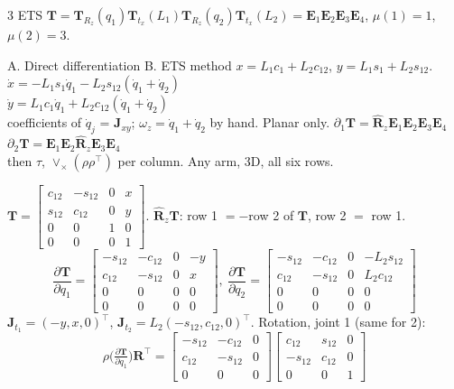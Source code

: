 \begin{multicols}{3}
ETS $\mathbf T=\mathbf T_{R_z}(q_1)\mathbf T_{t_x}(L_1)\mathbf T_{R_z}(q_2)\mathbf T_{t_x}(L_2)=\mathbf E_1\mathbf E_2\mathbf E_3\mathbf E_4$, $\mu(1)=1$, $\mu(2)=3$.
\begin{twoway}{A. Direct differentiation }{B. ETS method }
$x=L_1c_1+L_2c_{12}$, $y=L_1s_1+L_2s_{12}$.\\
$\dot x=-L_1s_1\dot q_1-L_2s_{12}(\dot q_1+\dot q_2)$\\
$\dot y=L_1c_1\dot q_1+L_2c_{12}(\dot q_1+\dot q_2)$\\
coefficients of $\dot q_j$ = $\mathbf J_{xy}$; $\omega_z=\dot q_1+\dot q_2$ by hand. Planar only.
\tcblower
$\partial_1\mathbf T=\hat{\mathbf R}_z\mathbf E_1\mathbf E_2\mathbf E_3\mathbf E_4$\\
$\partial_2\mathbf T=\mathbf E_1\mathbf E_2\hat{\mathbf R}_z\mathbf E_3\mathbf E_4$\\
then $\tau$, $\vee_\times(\rho\rho^\top)$ per column. Any arm, 3D, all six rows.
\end{twoway}
\begin{deriv}
$\mathbf T=\begin{bmatrix}c_{12}&-s_{12}&0&x\\s_{12}&c_{12}&0&y\\0&0&1&0\\0&0&0&1\end{bmatrix}$. $\hat{\mathbf R}_z\mathbf T$: row 1 $=-$row 2 of $\mathbf T$, row 2 $=$ row 1.
\[\frac{\partial\mathbf T}{\partial q_1}=\begin{bmatrix}-s_{12}&-c_{12}&0&-y\\c_{12}&-s_{12}&0&x\\0&0&0&0\\0&0&0&0\end{bmatrix},\ \frac{\partial\mathbf T}{\partial q_2}=\begin{bmatrix}-s_{12}&-c_{12}&0&-L_2s_{12}\\c_{12}&-s_{12}&0&L_2c_{12}\\0&0&0&0\\0&0&0&0\end{bmatrix}\]
$\mathbf J_{t_1}=(-y,x,0)^\top$, $\mathbf J_{t_2}=L_2(-s_{12},c_{12},0)^\top$. Rotation, joint 1 (same for 2):
\[\rho\Big(\tfrac{\partial\mathbf T}{\partial q_1}\Big)\mathbf R^\top=\begin{bmatrix}-s_{12}&-c_{12}&0\\c_{12}&-s_{12}&0\\0&0&0\end{bmatrix}\begin{bmatrix}c_{12}&s_{12}&0\\-s_{12}&c_{12}&0\\0&0&1\end{bmatrix}\]

\end{deriv}
\end{multicols}
